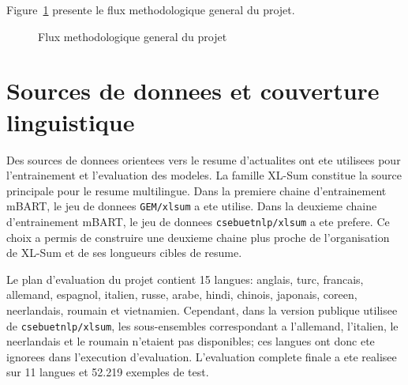 Figure~\ref{fig:methodology-overview-fr} presente le flux methodologique general du projet.

\begin{figure}[t]
\centering
{}
\caption{Flux methodologique general du projet}
\label{fig:methodology-overview-fr}
\end{figure}

\section{Sources de donnees et couverture linguistique}

Des sources de donnees orientees vers le resume d'actualites ont ete utilisees pour l'entrainement et l'evaluation des modeles. La famille XL-Sum constitue la source principale pour le resume multilingue. Dans la premiere chaine d'entrainement mBART, le jeu de donnees \texttt{GEM/xlsum} a ete utilise. Dans la deuxieme chaine d'entrainement mBART, le jeu de donnees \texttt{csebuetnlp/xlsum} a ete prefere. Ce choix a permis de construire une deuxieme chaine plus proche de l'organisation de XL-Sum et de ses longueurs cibles de resume.

Le plan d'evaluation du projet contient 15 langues: anglais, turc, francais, allemand, espagnol, italien, russe, arabe, hindi, chinois, japonais, coreen, neerlandais, roumain et vietnamien. Cependant, dans la version publique utilisee de \texttt{csebuetnlp/xlsum}, les sous-ensembles correspondant a l'allemand, l'italien, le neerlandais et le roumain n'etaient pas disponibles; ces langues ont donc ete ignorees dans l'execution d'evaluation. L'evaluation complete finale a ete realisee sur 11 langues et 52.219 exemples de test.

